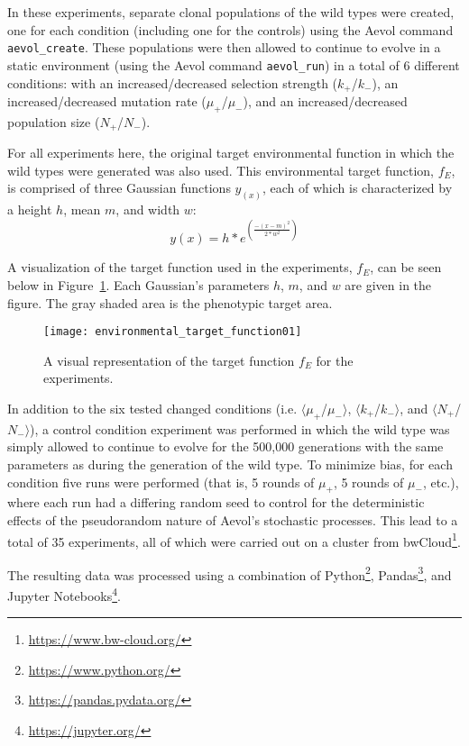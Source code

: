 In these experiments, separate clonal populations of the wild types were created, one for each condition (including one for the controls) using the Aevol command \texttt{aevol\_create}. These populations were then allowed to continue to evolve in a static environment (using the Aevol command \texttt{aevol\_run}) in a total of 6 different conditions: with an increased/decreased selection strength ($k_+$/$k_-$), an increased/decreased mutation rate ($\mu_+$/$\mu_-$), and an increased/decreased population size ($N_+$/$N_-$). 

For all experiments here, the original target environmental function in which the wild types were generated was also used. This environmental target function, $f_E$, is comprised of three Gaussian functions $y_(x)$, each of which is characterized by a height $h$, mean $m$, and width $w$:
\begin{equation*}
y(x) = h * e^{\left(\frac{-(x-m)^2}{2 * w^2} \right)}
\end{equation*}

A visualization of the target function used in the experiments, $f_E$, can be seen below in Figure~\ref{fig:target_function}. Each Gaussian's parameters $h$, $m$, and $w$ are given in the figure. The gray shaded area is the phenotypic target area.  

\begin{figure}[H]
	\centering
	\texttt{[image: environmental\_target\_function01]}
	\caption[Experimental target function]{A visual representation of the target function $f_E$ for the experiments.}
	\label{fig:target_function}
\end{figure}

 
In addition to the six tested changed conditions (i.e. $\langle\mu_+$/$\mu_-\rangle$, $\langle k_+$/$k_-\rangle$, and $\langle N_+$/$N_-\rangle$), a control condition experiment was performed in which the wild type was simply allowed to continue to evolve for the 500,000 generations with the same parameters as during the generation of the wild type. To minimize bias, for each condition five runs were performed (that is, 5 rounds of $\mu_+$, 5 rounds of $\mu_-$, etc.), where each run had a differing random seed to control for the deterministic effects of the pseudorandom nature of Aevol's stochastic processes. This lead to a total of 35 experiments, all of which were carried out on a cluster from bwCloud\footnote{\url{https://www.bw-cloud.org/}}. 

The resulting data was processed using a combination of Python\footnote{\url{https://www.python.org/}}, Pandas\footnote{\url{https://pandas.pydata.org/}}, and Jupyter Notebooks\footnote{\url{https://jupyter.org/}}.  

